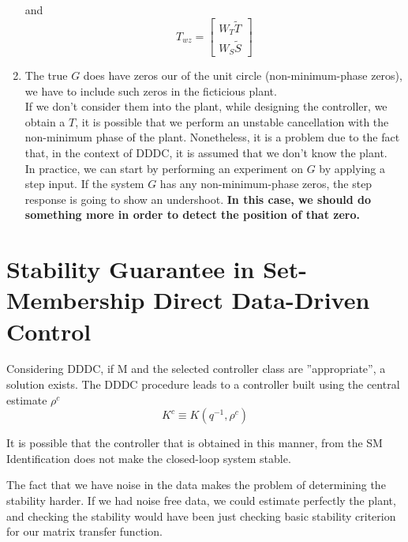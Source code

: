 \begin{enumerate}
\begin{example}
\[ \]
 and 
 \[
 T_{wz} = 
 \begin{bmatrix}
 W_T\tilde{T}\\
 W_S\tilde{S}
 \end{bmatrix}
 \]
    \end{example}
    \item The true $G$ does have zeros our of the unit circle (non-minimum-phase zeros), we have to include such zeros in the ficticious plant.\\
    If we don't consider them into the plant, while designing the controller, we obtain a $T$, it is possible that we perform an unstable cancellation with the non-minimum phase of the plant. Nonetheless,  it is a problem due to the fact that, in the context of DDDC, it is assumed that we don't know the plant.\\
    In practice, we can start by performing an experiment on $G$ by applying a step input. If the system $G$ has any non-minimum-phase zeros, the step response is going to show an undershoot. \textbf{In this case, we should do something more in order to detect the position of that zero.}
\end{enumerate}



 
 






















\section{Stability Guarantee in Set-Membership Direct Data-Driven Control}

Considering DDDC, if M and the selected controller class are ”appropriate”, a solution exists.
The DDDC procedure leads to a controller built using the central estimate $\rho^c$
\[
K^c \equiv K(q^{-1},\rho^c)
\]

It is possible that the controller that is obtained in this manner, from the SM Identification does not make the closed-loop system stable.

The fact that we have noise in the data makes the problem of determining the stability harder. If we had noise free data, we could estimate perfectly the plant, and checking the stability would have been just checking basic stability criterion for our matrix transfer function.

